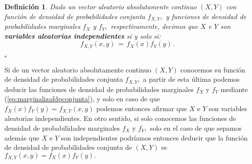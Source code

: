 \documentclass[spanish,10pt,letterpaper]{article}
\newtheorem{defi}{Definición}
\newcommand{\qed}{\begin{flushright}$\square$\end{flushright}}
\begin{document}
\begin{defi}\label{def:indepabscont}
    Dado un vector aleatorio absolutamente continuo $(X,Y)$ con función de densidad de probabilidades conjunta $f_{X,Y},$ y funciones de densidad de probabilidades marginales $f_X$ y $f_Y,$ respectivamente, decimos que $X$ e $Y$ son \textbf{variables aleatorias independientes} si y solo si:
    \begin{equation*}
        f_{X,Y}(x,y) \,=\, f_X(x)f_Y(y)\,.
    \end{equation*} \qed 
\end{defi}

Si de un vector aleatorio absolutamente continuo $(X,Y)$ conocemos su función de densidad de probabilidades conjunta $f_{X,Y},$ a partir de esta última podemos deducir las funciones de densidad de probabilidades marginales $f_X$ y $f_Y$ mediante (\ref{eq:marginalizafdpconjunta}), y solo en caso de que $f_X(x)f_Y(y)=f_{X,Y}(x,y)$ podemos entonces afirmar que $X$ e $Y$ son variables aleatorias independientes. En otro sentido, si solo conocemos las funciones de densidad de probabilidades marginales $f_X$ y $f_Y,$ solo en el caso de que sepamos además que $X$ e $Y$ son independientes podríamos entonces deducir que la función de densidad de probabilidades conjunta de $(X,Y)$ es $f_{X,Y}(x,y)=f_X(x)f_Y(y).$

\bigskip
\end{document}
